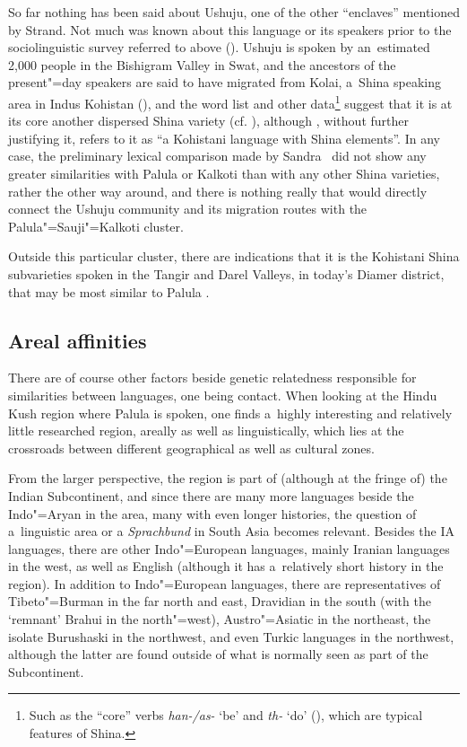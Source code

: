 So far nothing has been said about Ushuju, one of the other ``enclaves'' mentioned by Strand. Not much was known about this language or its speakers prior to the sociolinguistic survey referred to above (\citealt{decker1992}). Ushuju is spoken by an~estimated 2,000 people in the Bishigram Valley in Swat, and the ancestors of the present"=day speakers are said to have migrated from Kolai, a~Shina speaking area in Indus Kohistan (\citealt[69]{decker1992}), and the word list and other data\footnote{Such as the ``core'' verbs \textit{han-/as-} `be' and \textit{th-} `do' (\citealt[ 71--72, 199--203]{decker1992}), which are typical features of Shina.} suggest that it is at its core another dispersed Shina variety (cf. \citealt[255]{strand2001}), although \citet[9]{zoller2005}, without further justifying it, refers to it as ``a Kohistani language with Shina elements''. In any case, the preliminary lexical comparison made by Sandra~\citet[70]{decker1992} did not show any greater similarities with Palula or Kalkoti than with any other Shina varieties, rather the other way around, and there is nothing really that would directly connect the Ushuju community and its migration routes with the Palula"=Sauji"=Kalkoti cluster.


Outside this particular cluster, there are indications that it is the Kohistani Shina subvarieties spoken in the Tangir and Darel Valleys, in today's Diamer district, that may be most similar to Palula \citep[142--143]{radloff1992}. 


\subsection{Areal affinities}
\label{subsec:1-3-2}

There are of course other factors beside genetic relatedness responsible for similarities between languages, one being contact. When looking at the Hindu Kush region where Palula is spoken, one finds a~highly interesting and relatively little researched region, areally as well as linguistically, which lies at the crossroads between different geographical as well as cultural zones. 


From the larger perspective, the region is part of (although at the fringe of) the Indian Subcontinent, and since there are many more languages beside the Indo"=Aryan in the area, many with even longer histories, the question of a~linguistic area or a \textit{Sprachbund} in South Asia becomes relevant. Besides the IA languages, there are other Indo"=European languages, mainly Iranian languages in the west, as well as English (although it has a~relatively short history in the region). In addition to Indo"=European languages, there are representatives of Tibeto"=Burman in the far north and east, Dravidian in the south (with the `remnant' Brahui in the north"=west), Austro"=Asiatic in the northeast, the isolate Burushaski in the northwest, and even Turkic languages in the northwest, although the latter are found outside of what is normally seen as part of the Subcontinent. 


